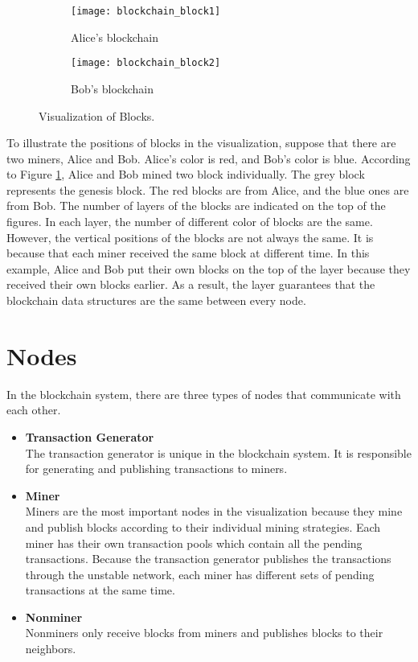 \begin{figure}[htb]
    \centering
    \begin{subfigure}[b]{0.4\textwidth}
        \centering
        \texttt{[image: blockchain\_block1]}
        \caption{Alice's blockchain}
    \end{subfigure}
    \hfill
    \begin{subfigure}[b]{0.4\textwidth}
        \centering
        \texttt{[image: blockchain\_block2]}
        \caption{Bob's blockchain}
    \end{subfigure}

    \caption{Visualization of Blocks.}
    \label{fig:visualization of blocks}
\end{figure}

To illustrate the positions of blocks in the visualization, suppose that there are two miners, Alice and Bob. Alice's color is red, and Bob's color is blue. According to Figure \ref{fig:visualization of blocks}, Alice and Bob mined two block individually. The grey block represents the genesis block. The red blocks are from Alice, and the blue ones are from Bob. The number of layers of the blocks are indicated on the top of the figures. In each layer, the number of different color of blocks are the same. However, the vertical positions of the blocks are not always the same. It is because that each miner received the same block at different time. In this example, Alice and Bob put their own blocks on the top of the layer because they received their own blocks earlier. As a result, the layer guarantees that the blockchain data structures are the same between every node.

\section{Nodes}

In the blockchain system, there are three types of nodes that communicate with each other. 
\begin{itemize}
    \item \textbf{Transaction Generator} \\
        The transaction generator is unique in the blockchain system. It is responsible for generating and publishing transactions to miners.
    \item \textbf{Miner} \\
        Miners are the most important nodes in the visualization because they mine and publish blocks according to their individual mining strategies. Each miner has their own transaction pools which contain all the pending transactions. Because the transaction generator publishes the transactions through the unstable network, each miner has different sets of pending transactions at the same time.
    \item \textbf{Nonminer} \\
        Nonminers only receive blocks from miners and publishes blocks to their neighbors.
\end{itemize}

